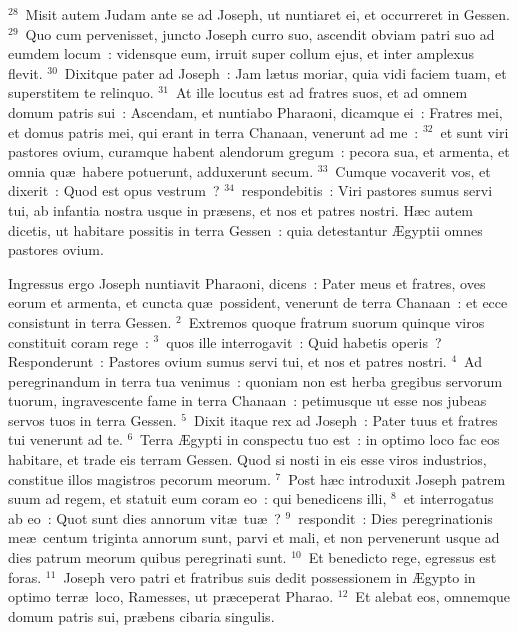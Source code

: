 ${}^{28}$~Misit autem Judam ante se ad Joseph, ut nuntiaret ei, et occurreret in Gessen.
${}^{29}$~Quo cum pervenisset, juncto Joseph curro suo, ascendit obviam patri suo ad eumdem locum~: vidensque eum, irruit super collum ejus, et inter amplexus flevit.
${}^{30}$~Dixitque pater ad Joseph~: Jam l\ae tus moriar, quia vidi faciem tuam, et superstitem te relinquo.
${}^{31}$~At ille locutus est ad fratres suos, et ad omnem domum patris sui~: Ascendam, et nuntiabo Pharaoni, dicamque ei~: Fratres mei, et domus patris mei, qui erant in terra Chanaan, venerunt ad me~:
${}^{32}$~et sunt viri pastores ovium, curamque habent alendorum gregum~: pecora sua, et armenta, et omnia qu\ae\ habere potuerunt, adduxerunt secum.
${}^{33}$~Cumque vocaverit vos, et dixerit~: Quod est opus vestrum~?
${}^{34}$~respondebitis~: Viri pastores sumus servi tui, ab infantia nostra usque in pr\ae sens, et nos et patres nostri. H\ae c autem dicetis, ut habitare possitis in terra Gessen~: quia detestantur \AE gyptii omnes pastores ovium.

\lettrine[lines=3,image=true,loversize=0.05,lraise=-0.03]{I}{}ngressus ergo Joseph nuntiavit Pharaoni, dicens~: Pater meus et fratres, oves eorum et armenta, et cuncta qu\ae\ possident, venerunt de terra Chanaan~: et ecce consistunt in terra Gessen.
${}^{2}$~Extremos quoque fratrum suorum quinque viros constituit coram rege~:
${}^{3}$~quos ille interrogavit~: Quid habetis operis~? Responderunt~: Pastores ovium sumus servi tui, et nos et patres nostri.
${}^{4}$~Ad peregrinandum in terra tua venimus~: quoniam non est herba gregibus servorum tuorum, ingravescente fame in terra Chanaan~: petimusque ut esse nos jubeas servos tuos in terra Gessen.
${}^{5}$~Dixit itaque rex ad Joseph~: Pater tuus et fratres tui venerunt ad te.
${}^{6}$~Terra \AE gypti in conspectu tuo est~: in optimo loco fac eos habitare, et trade eis terram Gessen. Quod si nosti in eis esse viros industrios, constitue illos magistros pecorum meorum.
${}^{7}$~Post h\ae c introduxit Joseph patrem suum ad regem, et statuit eum coram eo~: qui benedicens illi,
${}^{8}$~et interrogatus ab eo~: Quot sunt dies annorum vit\ae\ tu\ae~?
${}^{9}$~respondit~: Dies peregrinationis me\ae\ centum triginta annorum sunt, parvi et mali, et non pervenerunt usque ad dies patrum meorum quibus peregrinati sunt.
${}^{10}$~Et benedicto rege, egressus est foras.
${}^{11}$~Joseph vero patri et fratribus suis dedit possessionem in \AE gypto in optimo terr\ae\ loco, Ramesses, ut pr\ae ceperat Pharao.
${}^{12}$~Et alebat eos, omnemque domum patris sui, pr\ae bens cibaria singulis.


